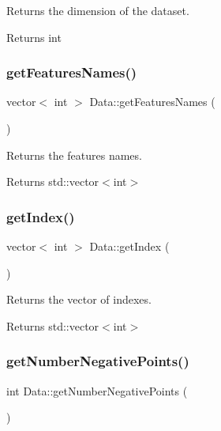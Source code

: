Returns the dimension of the dataset. 

\begin{DoxyReturn}{Returns}
int 
\end{DoxyReturn}
\mbox{\label{class_data_a2f6399baee6535e7f48250da54fbf00d}} 
\subsubsection{\texorpdfstring{get\+Features\+Names()}{getFeaturesNames()}}
{\footnotesize\ttfamily vector$<$ int $>$ Data\+::get\+Features\+Names (\begin{DoxyParamCaption}{ }\end{DoxyParamCaption})}



Returns the features names. 

\begin{DoxyReturn}{Returns}
std\+::vector$<$int$>$ 
\end{DoxyReturn}
\mbox{\label{class_data_a16685ae631c5bedc22c974980bc74c05}} 
\subsubsection{\texorpdfstring{get\+Index()}{getIndex()}}
{\footnotesize\ttfamily vector$<$ int $>$ Data\+::get\+Index (\begin{DoxyParamCaption}{ }\end{DoxyParamCaption})}



Returns the vector of indexes. 

\begin{DoxyReturn}{Returns}
std\+::vector$<$int$>$ 
\end{DoxyReturn}
\mbox{\label{class_data_a5166e74e946c2dbac75f383d63f018ea}} 
\subsubsection{\texorpdfstring{get\+Number\+Negative\+Points()}{getNumberNegativePoints()}}
{\footnotesize\ttfamily int Data\+::get\+Number\+Negative\+Points (\begin{DoxyParamCaption}{ }\end{DoxyParamCaption})}



